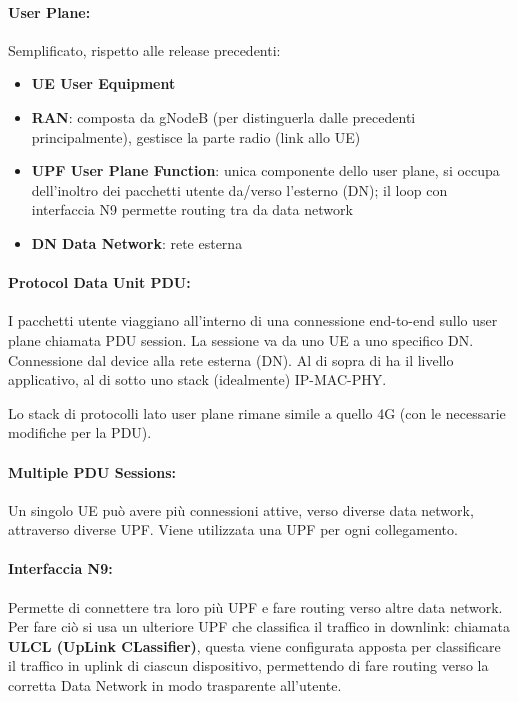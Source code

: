 \paragraph{User Plane:} Semplificato, rispetto alle release precedenti: 
\begin{itemize}
	\item \textbf{UE User Equipment}
	\item \textbf{RAN}: composta da gNodeB (per distinguerla dalle precedenti principalmente), gestisce la parte radio (link allo UE)
	\item \textbf{UPF User Plane Function}: unica componente dello user plane, si occupa dell'inoltro dei pacchetti utente da/verso l'esterno (DN); il loop con interfaccia N9 permette routing tra da data network
	\item \textbf{DN Data Network}: rete esterna
\end{itemize}

\paragraph{Protocol Data Unit PDU:} I pacchetti utente viaggiano all'interno di una connessione end-to-end sullo user plane chiamata PDU session. La sessione va da uno UE a uno specifico DN. Connessione dal device alla rete esterna (DN). Al di sopra di ha il livello applicativo, al di sotto uno stack (idealmente) IP-MAC-PHY.

Lo stack di protocolli lato user plane rimane simile a quello 4G (con le necessarie modifiche per la PDU).

\paragraph{Multiple PDU Sessions:} Un singolo UE può avere più connessioni attive, verso diverse data network, attraverso diverse UPF. Viene utilizzata una UPF per ogni collegamento.

\paragraph{Interfaccia N9:} Permette di connettere tra loro più UPF e fare routing verso altre data network. Per fare ciò si usa un ulteriore UPF che classifica il traffico in downlink: chiamata \textbf{ULCL (UpLink CLassifier)}, questa viene configurata apposta per classificare il traffico in uplink di ciascun dispositivo, permettendo di fare routing verso la corretta Data Network in modo trasparente all'utente.

